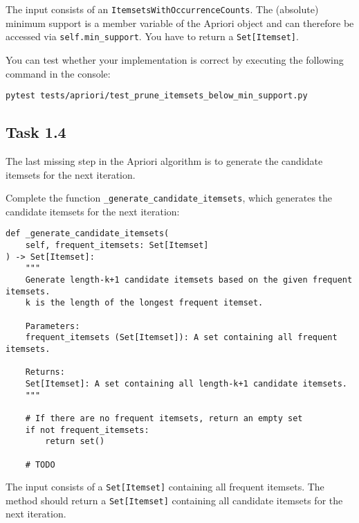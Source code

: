 \documentclass[
english,
smallborders
]{i6prcsht}
\begin{document}
\vspace*{0.1cm}

The input consists of an \texttt{ItemsetsWithOccurrenceCounts}. The (absolute) minimum support is a member variable of the Apriori object and can therefore be accessed via \texttt{self.min\_support}. You have to return a \texttt{Set[Itemset]}.

You can test whether your implementation is correct by executing the following command in the console:

\vspace*{0.3cm}

\begin{lstlisting}
pytest tests/apriori/test_prune_itemsets_below_min_support.py
\end{lstlisting}

\vspace*{0.1cm}

\subsection*{Task 1.4}

The last missing step in the Apriori algorithm is to generate the candidate itemsets for the next iteration.

Complete the function \texttt{\_generate\_candidate\_itemsets}, which generates the candidate itemsets for the next iteration:

\vspace*{0.3cm}

\begin{lstlisting}
def _generate_candidate_itemsets(
    self, frequent_itemsets: Set[Itemset]
) -> Set[Itemset]:
	"""
	Generate length-k+1 candidate itemsets based on the given frequent itemsets.
	k is the length of the longest frequent itemset.

	Parameters:
	frequent_itemsets (Set[Itemset]): A set containing all frequent itemsets.

	Returns:
	Set[Itemset]: A set containing all length-k+1 candidate itemsets.
	"""

	# If there are no frequent itemsets, return an empty set
	if not frequent_itemsets:
		return set()

	# TODO
\end{lstlisting}

\vspace*{0.1cm}

The input consists of a \texttt{Set[Itemset]} containing all frequent itemsets. The method should return a \texttt{Set[Itemset]} containing all candidate itemsets for the next iteration.
\end{document}
